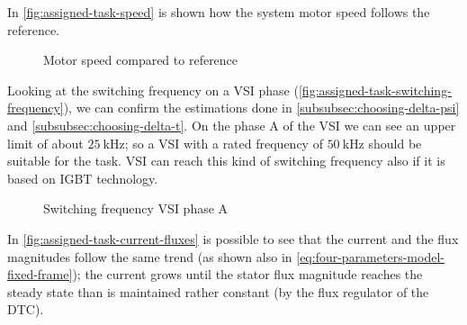 In \autoref{fig:assigned-task-speed} is shown how the system motor speed follows the reference.

\begin{figure}[htbp]
	\centering
	\caption{Motor speed compared to reference}
	\label{fig:assigned-task-speed}
\end{figure}

Looking at the switching frequency on a VSI phase (\autoref{fig:assigned-task-switching-frequency}), we can confirm the estimations done in \autoref{subsubsec:choosing-delta-psi} and \autoref{subsubsec:choosing-delta-t}.
On the phase A of the VSI we can see an upper limit of about $\qty{25}{\kilo\Hz}$; so a VSI with a rated frequency of $\qty{50}{\kilo\Hz}$ should be suitable for the task.
VSI can reach this kind of switching frequency also if it is based on IGBT technology.

\begin{figure}[htbp]
	\centering
	\caption{Switching frequency VSI phase A}
	\label{fig:assigned-task-switching-frequency}
\end{figure}

In \autoref{fig:assigned-task-current-fluxes} is possible to see that the current and the flux magnitudes follow the same trend (as shown also in \autoref{eq:four-parameters-model-fixed-frame}); the current grows until the stator flux magnitude reaches the steady state than is maintained rather constant (by the flux regulator of the DTC).

